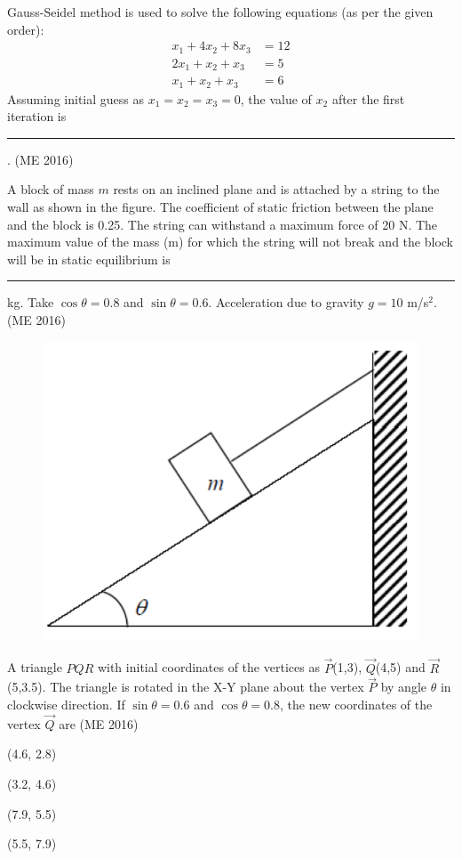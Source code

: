     \item Gauss-Seidel method is used to solve the following equations (as per the given order):
          \begin{align}
              x_1 + 4x_2 + 8x_3 & = 12 \\
              2x_1 + x_2 + x_3  & = 5  \\
              x_1 + x_2 + x_3   & = 6
          \end{align}
          Assuming initial guess as $x_1 = x_2 = x_3 = 0$, the value of $x_2$ after the first iteration is \rule{1cm}{0.01pt}.
	  \hfill(ME 2016)
    \item A block of mass $m$ rests on an inclined plane and is attached by a string to the wall as shown in the figure. The coefficient of static friction between the plane and the block is 0.25. The string can withstand a maximum force of 20 N. The maximum value of the mass (m) for which the string will not break and the block will be in static equilibrium is \rule{1cm}{0.01pt} kg.
          Take $\cos \theta = 0.8$ and $\sin \theta = 0.6$.
          Acceleration due to gravity $g = 10$ m/s$^2$.
	  \hfill(ME 2016)
          \begin{figure}[H]
              \centering
              \includegraphics[scale=0.3]{GATE/2016/ME/figs/q30}
              \caption{}
              \label{q30}
          \end{figure}
    \item A triangle $PQR$ with initial coordinates of the vertices as $\vec{P}$(1,3), $\vec{Q}$(4,5) and $\vec{R}$(5,3.5). The triangle is rotated in the X-Y plane about the vertex $\vec{P}$ by angle $\theta$ in clockwise direction. If $\sin \theta = 0.6$ and $\cos \theta = 0.8$, the new coordinates of the vertex $\vec{Q}$ are
	  \hfill(ME 2016)
          \begin{enumerate}
              \begin{multicols}{4}

                  \item (4.6, 2.8)

                  \item (3.2, 4.6)

                  \item (7.9, 5.5)

                  \item (5.5, 7.9)

              \end{multicols}

          \end{enumerate}
